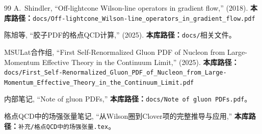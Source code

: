 \documentclass[12pt,a4paper]{ctexart}
\theoremstyle{definition}
\begin{document}
\begin{thebibliography}{99}
A.~Shindler,
``Off-lightcone Wilson-line operators in gradient flow,''
(2018).
\textbf{本库路径：}\texttt{docs/Off-lightcone\_Wilson-line\_operators\_in\_gradient\_flow.pdf}

陈旭等,
``胶子PDF的格点QCD计算,''
(2025).
\textbf{本库路径：}\texttt{docs/}相关文件。

MSULat合作组,
``First Self-Renormalized Gluon PDF of Nucleon from Large-Momentum Effective Theory in the Continuum Limit,''
(2025).
\textbf{本库路径：}\texttt{docs/First\_Self-Renormalized\_Gluon\_PDF\_of\_Nucleon\_from\_Large-Momentum\_Effective\_Theory\_in\_the\_Continuum\_Limit.pdf}

内部笔记,
``Note of gluon PDFs,''
\textbf{本库路径：}\texttt{docs/Note of gluon PDFs.pdf}。

格点QCD中的场强张量笔记,
``从Wilson圈到Clover项的完整推导与应用,''
\textbf{本库路径：}\texttt{补充/格点QCD中的场强张量.tex}。

\end{thebibliography}
\end{document}
